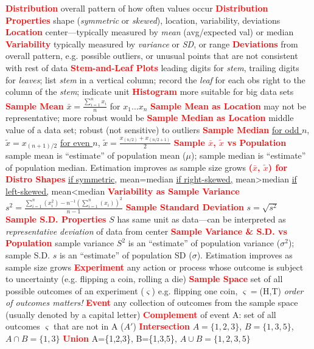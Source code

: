 \documentclass[10pt]{extarticle}
\let\oldtextbf\textbf
\renewcommand{\textbf}[1]{\textcolor{red}{\oldtextbf{#1}}}
\begin{document}
\noindent \textbf{Distribution} overall pattern of how often values occur
\textbf{Distribution Properties} shape (\emph{symmetric} or \emph{skewed}), location, variability, deviations
\textbf{Location} center---typically measured by \emph{mean} (avg/expected val) or median
\textbf{Variability} typically measured by \emph{variance} or \emph{SD}, or range
\textbf{Deviations} from overall pattern, e.g. possible outliers, or unusual points that are not consistent with rest of data
\textbf{Stem-and-Leaf Plots} leading digits for \emph{stem}, trailing digits for \emph{leaves}; list \emph{stem} in a vertical column; record the \emph{leaf} for each obs right to the column of the \emph{stem}; indicate unit
\textbf{Histogram} more suitable for big data sets 
\textbf{Sample Mean} $\bar{x} = \frac{\sum_{i=1}^{n}x_{i}}{n}$ for $x_{1}...x_{n}$
\textbf{Sample Mean as Location} may not be representative; more robust would be
\textbf{Sample Median as Location} middle value of a data set; robust (not sensitive) to outliers
\textbf{Sample Median} \underline{for odd $n$}, $\tilde{x} = x_{(n+1)/2}$ \underline{for even $n$}, $\tilde{x} = \frac{x_{(n/2)} + x_{(n/2+1)}}{2}$
\textbf{Sample $\bar{x}$, $\tilde{x}$ vs Population} sample mean is ``estimate'' of population mean ($\mu$); sample median is ``estimate'' of population median. Estimation improves as sample size grows
\textbf{($\bar{x}$, $\tilde{x}$) for Distro Shapes} \underline{if symmetric}, mean=median \underline{if right-skewed,} mean>median \underline{if left-skewed,} mean<median
\textbf{Variability as Sample Variance} $s^{2} = \frac{\sum_{i=1}^{n}(x_{i}^{2}) - n^{-1}(\sum_{i=1}^{n}(x_{i}))^{2}}{n-1}$
\textbf{Sample Standard Deviation} $s=\sqrt{s^{2}}$
\textbf{Sample S.D. Properties} $S$ has same unit as data---can be interpreted as \emph{representative deviation} of data from center
\textbf{Sample Variance \& S.D. vs Population} sample variance $S^{2}$ is an ``estimate'' of population variance ($\sigma^{2}$); sample S.D. $s$ is an ``estimate'' of population SD ($\sigma$). Estimation improves as sample size grows
\textbf{Experiment} any action or process whose outcome is subject to uncertainty (e.g. flipping a coin, rolling a die)
\textbf{Sample Space} set of all possible outcomes of an experiment ($\varsigma$) e.g. flipping one coin, $\varsigma=$(H,T) \emph{order of outcomes matters!}
\textbf{Event} any collection of outcomes from the sample space (usually denoted by a capital letter)
\textbf{Complement} of event A: set of all outcomes $\varsigma$ that are not in A ($A'$)
\textbf{Intersection} $A=\{1,2,3\}$, $B=\{1,3,5\}$, $A\cap B = \{1,3\}$ \textbf{Union} A=\{1,2,3\}, B=\{1,3,5\}, $A\cup B = \{1,2,3,5\}$
\end{document}
